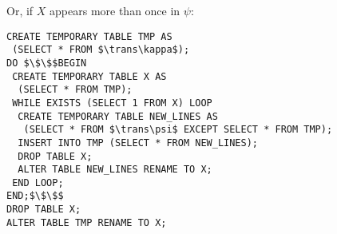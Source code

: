 \documentclass{beamer}
\newcommand*\trans[1]{\llparenthesis{#1}\rrparenthesis}
\begin{document}
\begin{frame}[fragile]
  Or, if $X$ appears more than once in $\psi$:
    \begin{lstlisting}[mathescape]
CREATE TEMPORARY TABLE TMP AS
 (SELECT * FROM $\trans\kappa$);
DO $\$\$$BEGIN
 CREATE TEMPORARY TABLE X AS
  (SELECT * FROM TMP);
 WHILE EXISTS (SELECT 1 FROM X) LOOP
  CREATE TEMPORARY TABLE NEW_LINES AS
   (SELECT * FROM $\trans\psi$ EXCEPT SELECT * FROM TMP);
  INSERT INTO TMP (SELECT * FROM NEW_LINES);
  DROP TABLE X;
  ALTER TABLE NEW_LINES RENAME TO X;
 END LOOP;
END;$\$\$$
DROP TABLE X;
ALTER TABLE TMP RENAME TO X;    
  \end{lstlisting}

\end{frame}
\end{document}
